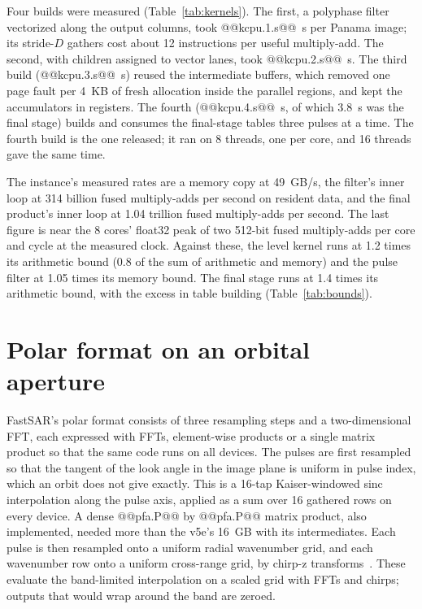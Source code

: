 \documentclass[11pt]{article}
\begin{document}
Four builds were measured (Table~\ref{tab:kernels}). The first, a polyphase filter vectorized along the output columns, took @@kcpu.1.s@@~s per Panama image; its stride-$D$ gathers cost about 12 instructions per useful multiply-add. The second, with children assigned to vector lanes, took @@kcpu.2.s@@~s. The third build (@@kcpu.3.s@@~s) reused the intermediate buffers, which removed one page fault per 4~KB of fresh allocation inside the parallel regions, and kept the accumulators in registers. The fourth (@@kcpu.4.s@@~s, of which 3.8~s was the final stage) builds and consumes the final-stage tables three pulses at a time. The fourth build is the one released; it ran on 8 threads, one per core, and 16 threads gave the same time.

The instance's measured rates are a memory copy at 49~GB/s, the filter's inner loop at 314 billion fused multiply-adds per second on resident data, and the final product's inner loop at 1.04 trillion fused multiply-adds per second. The last figure is near the 8 cores' float32 peak of two 512-bit fused multiply-adds per core and cycle at the measured clock. Against these, the level kernel runs at 1.2 times its arithmetic bound (0.8 of the sum of arithmetic and memory) and the pulse filter at 1.05 times its memory bound. The final stage runs at 1.4 times its arithmetic bound, with the excess in table building (Table~\ref{tab:bounds}).


\section{Polar format on an orbital aperture}
\label{app:pfa}

FastSAR's polar format consists of three resampling steps and a two-dimensional FFT, each expressed with FFTs, element-wise products or a single matrix product so that the same code runs on all devices. The pulses are first resampled so that the tangent of the look angle in the image plane is uniform in pulse index, which an orbit does not give exactly. This is a 16-tap Kaiser-windowed sinc interpolation along the pulse axis, applied as a sum over 16 gathered rows on every device. A dense @@pfa.P@@ by @@pfa.P@@ matrix product, also implemented, needed more than the v5e's 16~GB with its intermediates. Each pulse is then resampled onto a uniform radial wavenumber grid, and each wavenumber row onto a uniform cross-range grid, by chirp-z transforms~\cite{rabiner1969}. These evaluate the band-limited interpolation on a scaled grid with FFTs and chirps; outputs that would wrap around the band are zeroed.
\end{document}
